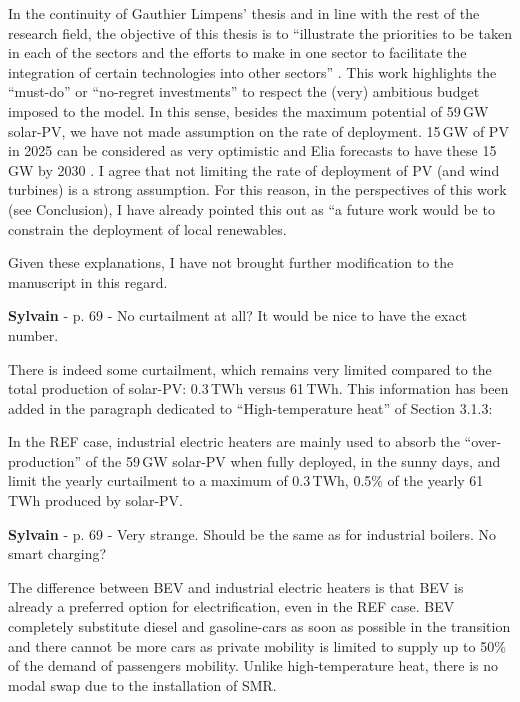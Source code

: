 \documentclass[12pt,a4paper]{article}
\begin{document}
\noindent In the continuity of Gauthier Limpens' thesis  and in line with the rest of the research field, the objective of this thesis is to ``illustrate the priorities to be taken in each of the sectors and the efforts to make in one sector to facilitate the integration of certain technologies into other sectors'' \cite{limpens2021generating}. This work highlights the ``must-do'' or ``no-regret investments'' to respect the (very) ambitious  budget imposed to the model. In this sense, besides the maximum potential of 59\,GW solar-PV, we have not made assumption on the rate of deployment. 15\,GW of PV in 2025 can be considered as very optimistic and Elia forecasts to have these 15\,GW by 2030 \cite{Elia_2024_2034}. I agree that not limiting the rate of deployment of PV (and wind turbines) is a strong assumption. For this reason, in the perspectives of this work (see Conclusion), I have already pointed this out as ``a future work would be to constrain the deployment of local renewables.

Given these explanations, I have not brought further modification to the manuscript in this regard.

\begin{mdframed}[style=comment] %
{\color{purple} \textbf{Sylvain}} - p. 69 - No curtailment at all? It would be nice to have the exact number.
\end{mdframed}

\noindent There is indeed some curtailment, which remains very limited compared to the total production of solar-PV: 0.3\,TWh versus 61\,TWh. This information has been added {\color{blue}in the paragraph dedicated to ``High-temperature heat'' of Section 3.1.3}: 

\begin{mdframed}[style=manuscript] %
In the REF case, industrial electric heaters are mainly used to absorb the ``over-production'' of the 59\,GW solar-PV when fully deployed, in the sunny days, and limit the yearly curtailment to a maximum of 0.3\,TWh, 0.5\% of the yearly 61\,TWh produced by solar-PV.
\end{mdframed}

\begin{mdframed}[style=comment] %
{\color{purple} \textbf{Sylvain}} - p. 69 - Very strange. Should be the same as for industrial boilers. No smart charging?
\end{mdframed}

\noindent The difference between BEV and industrial electric heaters is that BEV is already a preferred option for electrification, even in the REF case. BEV completely substitute diesel and gasoline-cars as soon as possible in the transition and there cannot be more cars as private mobility is limited to supply up to 50\% of the demand of passengers mobility. Unlike high-temperature heat, there is no modal swap due to the installation of SMR.
\end{document}
